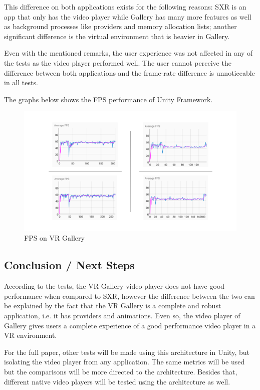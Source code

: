 \documentclass[12pt]{article}
\begin{document}
This difference on both applications exists for the following reasons: SXR is an app that only has the video player while Gallery has many more features as well as background processes like providers and memory allocation lists; another significant difference is the virtual environment that is heavier in Gallery.

Even with the mentioned remarks, the user experience was not affected in any of the tests as the video player performed well. The user cannot perceive the difference between both applications and the frame-rate difference is unnoticeable in all tests.

The graphs below shows the FPS performance of Unity Framework.

\begin{figure}[h!]
    \centerline{\includegraphics[scale=0.45]{images/Gallery.png}}
    \caption{FPS on VR Gallery}
    \label{gallery-graph}
\end{figure}

\subsection{Conclusion / Next Steps}

According to the tests, the VR Gallery video player does not have good performance when compared to SXR, however the difference between the two can be explained by the fact that the VR Gallery is a complete and robust application, i.e. it has providers and animations. Even so, the video player of Gallery gives users a complete experience of a good performance video player in a VR environment.

For the full paper, other tests will be made using this architecture in Unity, but isolating the video player from any application. The same metrics will be used but the comparisons will be more directed to the architecture. Besides that, different native video players will be tested using the architecture as well.


\end{document}
